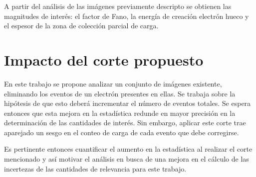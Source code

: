 A partir del análisis de las imágenes previamente descripto se obtienen las magnitudes de interés: el factor de Fano, la energía de creación electrón hueco y el espesor de la zona de colección parcial de carga.

\section{Impacto del corte propuesto}
\noindent En este trabajo se propone analizar un conjunto de imágenes existente, eliminando los eventos de un electrón presentes en ellas. Se trabaja sobre la hipótesis de que esto deberá incrementar el número de eventos totales. Se espera entonces que esta mejora en la estadística redunde en mayor precisión en la determinación de las cantidades de interés. Sin embargo, aplicar este corte trae aparejado un sesgo en el conteo de carga de cada evento que debe corregirse.

Es pertinente entonces cuantificar el aumento en la estadística al realizar el corte mencionado y así motivar el análisis en busca de una mejora en el cálculo de las incertezas de las cantidades de relevancia para este trabajo.


